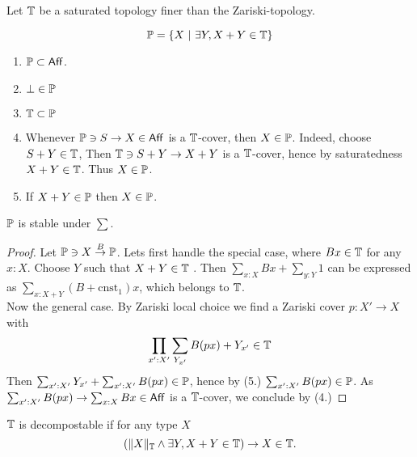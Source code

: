 Let $\mathbb{T}$ be a saturated topology finer than the Zariski-topology.
\begin{definition}
	\[
	\mathbb{P}= \{X  \ | \ \exists Y , X + Y \in \mathbb{T}\}
	\]
\end{definition}

\begin{lemma}

\begin{enumerate}
	\
	\item $\mathbb{P} \subset \mathsf{Aff}$.
	\item $\bot \in \mathbb{P}$
	\item $\mathbb{T} \subset \mathbb{P}$
	\item Whenever $\mathbb{P} \ni S \to X \in \mathsf{Aff}$ is a $\mathbb{T}$-cover, then $X \in \mathbb{P}$. Indeed, choose $S + Y \in \mathbb{T}$, Then $\mathbb{T} \ni S + Y \to X + Y$ is a $\mathbb{T}$-cover, hence by saturatedness $X + Y \in \mathbb{T}$. Thus $X \in \mathbb{P}$.
	\item If $X + Y \in \mathbb{P}$ then $X \in \mathbb{P}$.
\end{enumerate}
\end{lemma}


\begin{prop}
	$\mathbb{P}$ is stable under $\sum$.
\end{prop}
\begin{proof}
	Let $\mathbb{P} \ni X \overset{B}{\to} \mathbb{P}$. Lets first handle the special case, where $B x \in \mathbb{T}$ for any $x : X$. Choose $Y$ such that $X + Y \in \mathbb{T}$ . Then $\sum_{x: X} B x + \sum_{y:Y} 1$ can be expressed as $\sum_{x : X + Y} (B + \mathrm{cnst}_1) x$, which belongs to $\mathbb{T}$. \\	 
	Now the general case. By Zariski local choice we find a Zariski cover $p : X' \to X$ with 
	\[
	\prod_{x' : X'} \sum_{Y_{x'}} B (p x) + Y_{x'} \in \mathbb{T}
	\]
	Then $\sum_{x' : X'} Y_{x'} + \sum_{x' : X'} B (p x) \in \mathbb{P}$, hence by (5.) $\sum_{x': X'} B (p x) \in \mathbb{P}$. As $\sum_{x': X'} B (p x) \to \sum_{x: X} B x \in \mathsf{Aff}$ is a $\mathbb{T}$-cover, we conclude by (4.)

\end{proof}

\begin{definition}
	$\mathbb{T}$ is decompostable if for any type $X$
	\[ \left(\|X\|_{\mathbb{T}} \land \exists Y , X + Y \in \mathbb{T}  \right) \to X \in \mathbb{T}. \]\\ 

\end{definition}


